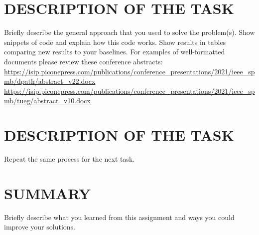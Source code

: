 \documentclass{article}
\begin{document}
        \section{DESCRIPTION OF THE TASK}
        \begin{flushleft}
        Briefly describe the general approach that you used to solve the problem(s). Show snippets of code and explain how this code works. Show results in tables comparing new results to your baselines.\break
        \break
        For examples of well-formatted documents please review these conference abstracts:\break
        \break
        \url{https://isip.piconepress.com/publications/conference_presentations/2021/ieee_spmb/dpath/abstract_v22.docx}\break
        \url{https://isip.piconepress.com/publications/conference_presentations/2021/ieee_spmb/tueg/abstract_v10.docx}
        \end{flushleft}
        \section{DESCRIPTION OF THE TASK}
        Repeat the same process for the next task.
        \section{SUMMARY}
        Briefly describe what you learned from this assignment and ways you could improve your solutions.
\end{document}
